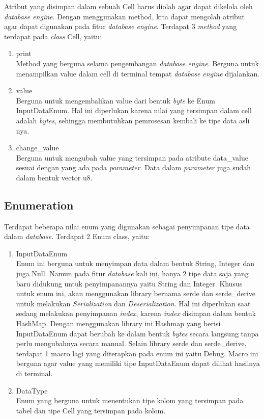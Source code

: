 Atribut yang disimpan dalam sebuah Cell harus diolah agar dapat dikelola oleh \emph{database engine}. Dengan menggunakan method, kita dapat mengolah atribut agar dapat digunakan pada
fitur \emph{database engine}. Terdapat 3 \emph{method} yang terdapat pada \emph{class} Cell, yaitu:

\begin{enumerate}
	\item print \\
	Method yang berguna selama pengembangan \emph{database engine}. Berguna untuk menampilkan value dalam cell di terminal tempat \emph{database engine} dijalankan.  

	\item value \\
  Berguna untuk mengembalikan value dari bentuk \emph{byte} ke Enum InputDataEnum. Hal ini diperlukan karena nilai yang tersimpan dalam cell adalah \emph{bytes}, sehingga membutuhkan pemrosesan
  kembali ke tipe data asli nya. 

	\item change\_value \\
  Berguna untuk mengubah value yang tersimpan pada atribute data\_value sesuai dengan yang ada pada \emph{parameter}. Data dalam \emph{parameter} juga sudah dalam bentuk vector u8. 
\end{enumerate}

\subsection{Enumeration}
Terdapat beberapa nilai enum yang digunakan sebagai penyimpanan tipe data dalam \emph{database}. Terdapat 2 Enum class, yaitu:
\begin{enumerate}
	\item InputDataEnum \\
  Enum ini berguna untuk menyimpan data dalam bentuk String, Integer dan juga Null. Namun pada fitur \emph{database} kali ini, hanya 2 tipe data saja yang baru didukung untuk penyimpanannya
  yaitu String dan Integer. Khusus untuk enum ini, akan menggunakan library bernama serde dan serde\_derive untuk melakukan \emph{Serialization} dan \emph{Deserialization}. Hal ini diperlukan saat sedang
  melakukan penyimpanan \emph{index}, karena \emph{index} disimpan dalam bentuk HashMap. Dengan menggunakan library ini Hashmap yang berisi InputDataEnum dapat berubah ke dalam bentuk \emph{bytes} secara langsung
  tanpa perlu mengubahnya secara manual. Selain library serde dan serde\_derive, terdapat 1 macro lagi yang diterapkan pada enum ini yaitu Debug. Macro ini berguna agar value yang memiliki tipe InputDataEnum dapat
  dilihat hasilnya di terminal.
	
	\item DataType \\
  Enum yang berguna untuk menentukan tipe kolom yang tersimpan pada tabel dan tipe Cell yang tersimpan pada kolom.
\end{enumerate}

